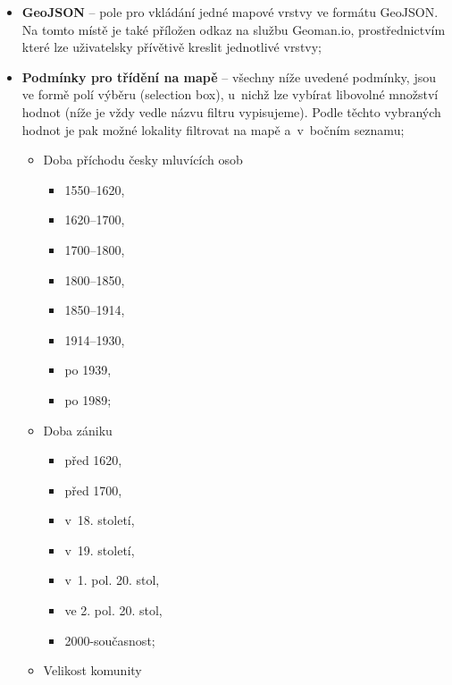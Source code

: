 \begin{itemize}
\tightlist
\item
  \textbf{GeoJSON} -- pole pro vkládání jedné mapové vrstvy ve formátu GeoJSON. Na tomto místě je také příložen odkaz na službu Geoman.io, prostřednictvím které lze uživatelsky přívětivě kreslit jednotlivé vrstvy;
\item
  \textbf{Podmínky pro třídění na mapě} -- všechny níže uvedené podmínky, jsou ve formě polí výběru (selection box), u~nichž lze vybírat libovolné množství hodnot (níže je vždy vedle názvu filtru vypisujeme). Podle těchto vybraných hodnot je pak možné lokality filtrovat na mapě a~v~bočním seznamu;

  \begin{itemize}
  \tightlist
  \item
    Doba příchodu česky mluvících osob

    \begin{itemize}
    \tightlist
    \item
      1550--1620,
    \item
      1620--1700,
    \item
      1700--1800,
    \item
      1800--1850,
    \item
      1850--1914,
    \item
      1914--1930,
    \item
      po 1939,
    \item
      po 1989;
    \end{itemize}
  \item
    Doba zániku

    \begin{itemize}
    \tightlist
    \item
      před 1620,
    \item
      před 1700,
    \item
      v~18. století,
    \item
      v~19. století,
    \item
      v~1. pol. 20. stol,
    \item
      ve 2. pol. 20. stol,
    \item
      2000-současnost;
    \end{itemize}
  \item
    Velikost komunity
  \end{itemize}
\end{itemize}

